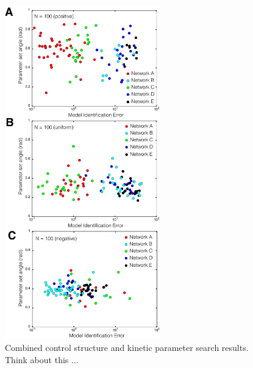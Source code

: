\documentclass[12pt]{article}
\begin{document}
\clearpage

\begin{figure}
\centering
\includegraphics[width=0.6\textwidth]{./figs/Figure-7-ControlSearch.pdf}
\caption{Combined control structure and kinetic parameter search results. Think about this ...}\label{fig-control-search}
\end{figure}

\clearpage

\renewcommand\thefigure{S\arabic{figure}}
\renewcommand\thetable{T\arabic{table}}
\renewcommand\thepage{S-\arabic{page}}
\renewcommand\theequation{S\arabic{equation}}

\setcounter{equation}{0}
\setcounter{table}{0}
\setcounter{figure}{0}
\setcounter{page}{1}
\end{document}

